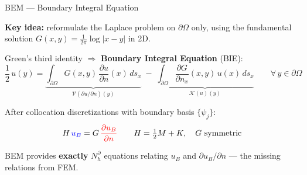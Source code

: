 \documentclass[aspectratio=169]{beamer}
\begin{document}
\begin{frame}{BEM — Boundary Integral Equation}

  \textbf{Key idea:} reformulate the Laplace problem on $\partial\Omega$ only,
  using the fundamental solution $G(x,y) = \frac{1}{2\pi}\log|x-y|$ in 2D.

  \bigskip
  Green's third identity $\Rightarrow$ \textbf{Boundary Integral Equation} (BIE):
  \[
    \frac{1}{2}\,u(y) = \underbrace{\int_{\partial\Omega} G(x,y)\,
    \frac{\partial u}{\partial n}(x)\,ds_x}_{\mathcal{V}(\partial u/\partial n)(y)}
    \;-\;
    \underbrace{\int_{\partial\Omega} \frac{\partial G}{\partial n_x}(x,y)\,u(x)\,ds_x}_{
      \mathcal{K}(u)(y)}
    \qquad \forall\, y \in \partial\Omega
  \]

  \bigskip
  After collocation discretizations with boundary basis $\{\psi_j\}$:
  \[
    H\,\textcolor{blue}{u_B} = G\,\textcolor{red}{\dfrac{\partial u_B}{\partial n}}
    \qquad
    H = \tfrac{1}{2}M + K, \quad G \text{ symmetric}
  \]

  \begin{block}{}
    BEM provides \textbf{exactly} $N_h^\partial$ equations relating $u_B$ and
    $\partial u_B/\partial n$ — the missing relations from FEM.
  \end{block}

\end{frame}

\end{document}
